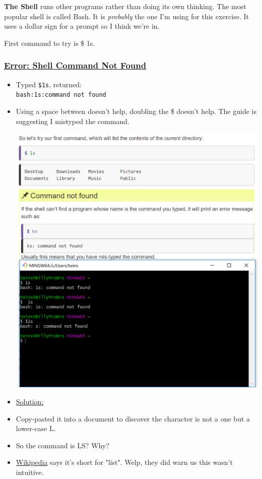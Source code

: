 \documentclass[12pt]{article}
\begin{document}
\textbf{The Shell} runs other programs rather than doing its own thinking. The most popular shell is called Bash. It is \textit{probably} the one I'm using for this exercise. It uses a dollar sign for a prompt so I think we're in.

First command to try is \$ 1s.

\subsubsection{\texorpdfstring{\underline{Error: Shell Command Not Found}}{}}\label{error:er13}
\begin{itemize}
    \item Typed \texttt{\$1s}, returned: \\\texttt{bash:1s:command not found}
    \item Using a space between doesn't help, doubling the \$ doesn't help. The guide is suggesting I mistyped the command.
    
    \includegraphics[scale=0.8]{imgcommandnotfound.PNG}
\end{itemize}
\begin{itemize}
\renewcommand{\labelitemi}{}
\item \underline{Solution:}
\renewcommand{\labelitemi}{$\bullet$}
    \item Copy-pasted it into a document to discover the character is not a one but a lower-case L.
    \item So the command is LS? Why?
    \item \href{https://en.wikipedia.org/wiki/Ls}{Wikipedia} says it's short for "list". Welp, they did warn us this wasn't intuitive.
\end{itemize}
\end{document}
